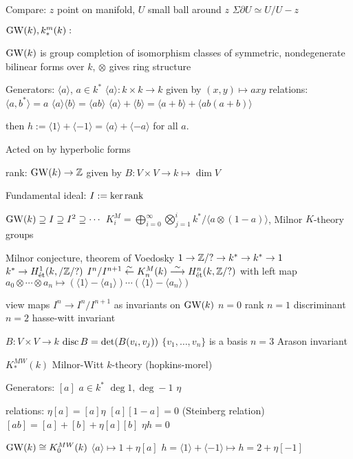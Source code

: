 Compare: $z$ point on manifold, $U$ small ball around $z$
$\Sigma \partial U \simeq U/U-z$





$\operatorname{GW}(k), k^m_*(k):$

$\operatorname{GW}(k)$ is group completion of isomorphism classes of symmetric, nondegenerate bilinear forms over $k$, $\otimes$ gives ring structure

Generators: $\langle a \rangle$, $a \in k^*$
$\langle a \rangle: k \times k \to k$ given by $(x,y) \mapsto axy$
relations:
$\langle a,b^*\rangle= a$
$\langle a\rangle \langle b \rangle = \langle ab \rangle$
$\langle a \rangle + \langle b \rangle= \langle a+b\rangle + \langle ab(a+b)\rangle$

then $h:= \langle 1 \rangle + \langle -1 \rangle= \langle a \rangle + \langle -a \rangle$ for all $a$.

Acted on by hyperbolic forms

rank: $\operatorname{GW}(k) \to \mathbb{Z}$ given by $B: V \times V \to k \mapsto \dim V$

Fundamental ideal: $I:= \ker \operatorname{rank}$

$\operatorname{GW}(k) \supseteq I \supseteq I^2 \supseteq \cdots$
$K_i^M= \bigoplus_{i=0}^\infty \bigotimes_{j=1}^i k^*/ \langle a \otimes (1-a) \rangle$, Milnor $K$-theory groups 



Milnor conjecture, theorem of Voedosky 
$1 \to \mathbb{Z}/? \to k^* \to k^* \to 1$
$k^* \to H^1_{\text{\'et}}(k,/\mathbb{Z}/?)$
$I^n/I^{n+1} \stackrel{\sim}{\leftarrow} K_n^M(k) \stackrel{\sim}{\longrightarrow} H^n_{\text{\'et}}(k,\mathbb{Z}/?)$
with left map $a_0 \otimes \cdots \otimes a_n \mapsto (\langle 1 \rangle - \langle a_1 \rangle) \cdots (\langle 1 \rangle - \langle a_n \rangle)$

view maps $I^n \to I^n/I^{n+1}$ as invariants on $\operatorname{GW}(k)$
$n=0$ rank
$n=1$ discriminant
$n=2$ hasse-witt invariant


$B: V \times V \to k$
$\operatorname{disc} B= \det(B(v_i,v_j))$
$\{v_1,\ldots,v_n\}$ is a basis
$n=3$ Arason invariant 



$K_*^{MW}(k)$ Milnor-Witt $k$-theory (hopkins-morel)

Generators: $[a]$ $a \in k^*$ $\deg 1, \deg -1$
$\eta$

relations:
$\eta[a]= [a] \eta$
$[a][1-a]=0$ (Steinberg relation)
$[ab]=[a]+[b]+\eta[a][b]$
$\eta h=0$

$\operatorname{GW}(k) \cong K^{MW}_0(k)$
$\langle a \rangle \mapsto 1+ \eta[a]$
$h= \langle 1 \rangle + \langle -1 \rangle \mapsto h= 2+ \eta[-1]$



